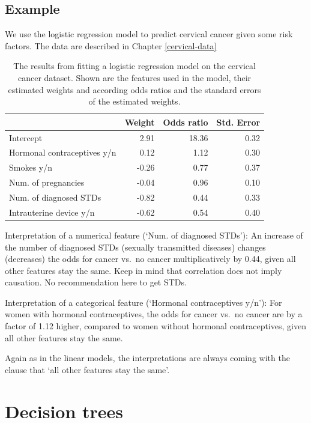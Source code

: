 \documentclass[12pt,]{krantz}
\theoremstyle{definition}
\theoremstyle{definition}
\theoremstyle{definition}
\theoremstyle{remark}
\begin{document}
\subsection{Example}\label{example}

We use the logistic regression model to predict cervical cancer given
some risk factors. The data are described in Chapter \ref{cervical-data}

\begin{table}

\caption{\label{tab:logistic-example}The results from fitting a logistic regression model on the cervical cancer dataset. Shown are the features used in the model, their estimated weights and according odds ratios and the standard errors of the estimated weights.}
\centering
\begin{tabular}[t]{l|r|r|r}
\hline
  & Weight & Odds ratio & Std. Error\\
\hline
Intercept & 2.91 & 18.36 & 0.32\\
\hline
Hormonal contraceptives y/n & 0.12 & 1.12 & 0.30\\
\hline
Smokes y/n & -0.26 & 0.77 & 0.37\\
\hline
Num. of pregnancies & -0.04 & 0.96 & 0.10\\
\hline
Num. of diagnosed STDs & -0.82 & 0.44 & 0.33\\
\hline
Intrauterine device y/n & -0.62 & 0.54 & 0.40\\
\hline
\end{tabular}
\end{table}

Interpretation of a numerical feature (`Num. of diagnosed STDs'): An
increase of the number of diagnosed STDs (sexually transmitted diseases)
changes (decreases) the odds for cancer vs.~no cancer multiplicatively
by 0.44, given all other features stay the same. Keep in mind that
correlation does not imply causation. No recommendation here to get
STDs.

Interpretation of a categorical feature (`Hormonal contraceptives y/n'):
For women with hormonal contraceptives, the odds for cancer vs.~no
cancer are by a factor of 1.12 higher, compared to women without
hormonal contraceptives, given all other features stay the same.

Again as in the linear models, the interpretations are always coming
with the clause that `all other features stay the same'.

\section{Decision trees}\label{tree}
\end{document}
